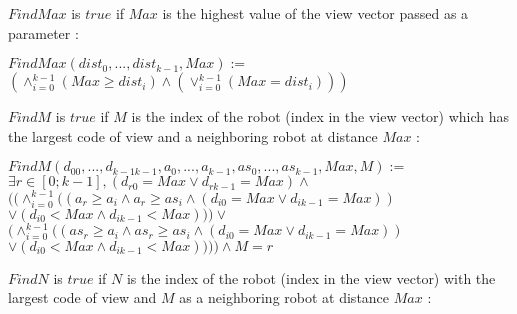 \documentclass{article}
\begin{document}
$FindMax$ is $true$ if $Max$ is the highest value of the view vector passed as a parameter :

\begin{center}

$FindMax(dist_{0}, ...,dist_{k-1}, Max):=$\\
$(\land_{i=0}^{k-1} (Max \geq dist_{i}) \land (\lor_{i=0}^{k-1} (Max = dist_{i})))$
\end{center}

$FindM$ is $true$ if $M$ is the index of the robot (index in the view vector) which has the largest code of view and a neighboring robot at distance $Max$ :

\begin{center}

$FindM(d_{00}, ...,d_{k-1k-1}, a_{0}, ..., a_{k-1}, as_{0}, ..., as_{k-1}, Max, M):=$\\
$\exists r \in [0; k-1], (d_{r0} = Max \lor d_{rk-1} = Max) \land $\\
$((\land_{i=0}^{k-1} ((a_{r} \geq a_i \land a_{r} \geq as_i \land (d_{i0} = Max \lor d_{ik-1} = Max))$\\
$\lor (d_{i0} < Max \land d_{ik-1} < Max))) \lor$\\
$(\land_{i=0}^{k-1} ((as_{r} \geq a_i \land as_{r} \geq as_i \land (d_{i0} = Max \lor d_{ik-1} = Max))$\\
$\lor (d_{i0} < Max \land d_{ik-1} < Max)))) \land M = r $
\end{center}

$FindN$ is $true$ if $N$ is the index of the robot (index in the view vector) with the largest code of view and $M$ as a neighboring robot at distance $Max$ :
\end{document}
